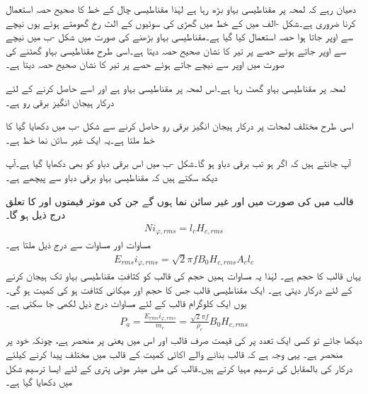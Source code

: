 دھیان رہے کہ لمحہ  پر مقناطیسی بہاو بڑھ رہا ہے لہٰذا مقناطیسی چال کے خط کا صحیح حصہ استعمال کرنا ضروری ہے۔شکل -الف میں    کے خط میں گھڑی کی سوئیوں کے الٹ رخ گھومتے ہوئے یوں نیچے سے اوپر جاتا ہوا حصہ استعمال کیا گیا ہے۔مقناطیسی بہاو بڑھنے کی صورت میں شکل -ب میں نیچے سے اوپر جاتے  ہوئے حصے پر تیر کا نشان صحیح حصہ دیتا ہے۔اسی طرح مقناطیسی بہاو گھٹنے کی صورت میں اوپر سے نیچے جاتے ہوئے حصے پر تیر کا نشان صحیح حصہ دیتا ہے۔

 لمحہ  پر مقناطیسی بہاو گھٹ رہا ہے۔اس لمحہ پر مقناطیسی بہاو  ہے اور اسے حاصل کرنے کے لئے درکار ہیجان انگیز برقی رو  ہے۔

اسی طرح مختلف لمحات پر درکار ہیجان انگیز برقی رو حاصل کرنے سے شکل -ب میں دکھایا گیا    کا خط ملتا ہے۔یہ ایک غیر سائن نما خط ہے۔

آپ جانتے ہیں کہ اگر  ہو تب برقی دباو  ہو گا۔شکل -ب میں اس برقی دباو کو بھی دکھایا گیا ہے۔آپ دیکھ سکتے ہیں کہ مقناطیسی بہاو برقی دباو سے  پیچھے ہے۔

قالب میں   کی صورت میں   اور   غیر سائن نما ہوں گے جن  کی موثر قیمتوں  اور   کا تعلق درج ذیل ہو گا۔
\begin{align}\label{مساوات_مقناطیسی_دور_دباو_برابر_شدت_ضرب_لمبائی}
N i_{\varphi,rms}=l_c H_{c,rms}
\end{align}
مساوات    اور مساوات   سے درج ذیل ملتا ہے۔
\begin{align}\label{مساوات_مقناطیسی_دور_درکار_دباو_ضرب_رو}
E_{rms} i_{\varphi,rms}=\sqrt{2} \pi f B_0 H_{c,rms} A_c l_c
\end{align}
یہاں  قالب کا حجم ہے۔ لہٰذا یہ مساوات ہمیں  حجم کی قالب  کو  کثافتِ مقناطیسی بہاو تک ہیجان کرنے کے لئے درکار  دیتی ہے۔ ایک مقناطیسی قالب جس کا حجم   اور  میکانی کثافت   ہو کی کمیت  ہو گی۔ یوں  ایک کلوگرام  قالب کے لئے مساوات   درج ذیل لکھی جا سکتی ہے۔
\begin{align}
P_a=\frac{E_{rms} i_{\varphi,rms}}{m_c}=\frac{\sqrt{2} \pi f}{\rho_c} B_0 H_{c,rms}
\end{align}
دیکھا جائے تو کسی ایک تعدد   پر  کی قیمت صرف قالب اور اس میں  یعنی  پر منحصر ہے، چونکہ  خود  پر منحصر ہے۔ یہی وجہ ہے کہ  قالب بنانے والے اکائی کمیت کے قالب میں مختلف  پیدا کرنے کیلئے درکار  کی  بالمقابل  کی ترسیم مہیا کرتے ہیں۔قالب کی  ملی میٹر موٹی پتری کے لئے ایسا ترسیم  شکل  میں دکھایا گیا ہے۔
